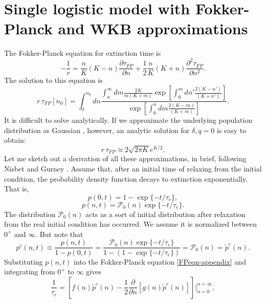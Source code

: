 \section*{Single logistic model with Fokker-Planck and WKB approximations} %
The Fokker-Planck equation for extinction time is \cite{Nisbet1982}
\begin{equation}
-\frac{1}{r} = \frac{n}{K}(K-n)\frac{\partial\tau_{FP}}{\partial n}+\frac{1}{2}\frac{n}{K}(K+n)\frac{\partial^2\tau_{FP}}{\partial n^2}. 
 \label{FPeqn-appendix} 
\end{equation}
The solution to this equation is
\begin{equation}%
r\,\tau_{FP}[n_0] = \int^{n_0}_0 dn\frac{\int_n^\infty dm\frac{2K}{m(K+m)}\exp[\int^m_0dn'\frac{2(K-n')}{(K+n')}]}{\exp[\int^n_0dm\frac{2(K-m)}{(K+m)}]}.  
\end{equation}
It is difficult to solve analytically. 
If we approximate the underlying population distribution as Gaussian \cite{Nisbet1982}, however, an analytic solution for $\delta,q=0$ is easy to obtain:
\begin{equation}
r\,\tau_{FP} \approx 2\sqrt{2\pi K}e^{K/2}. 
 \label{tau-fp-gauss-appendix}
\end{equation}
Let me sketch out a derivation of all these approximations, in brief, following Nisbet and Gurney \cite{Nisbet1982}. 
Assume that, after an initial time of relaxing from the initial condition, the probability density function decays to extinction exponentially. That is,
\begin{equation}
p(0,t) = 1 - \exp\{-t/\tau_e\},
\end{equation}
\begin{equation}
p(n,t) = \mathcal{P}_0(n)\exp\{-t/\tau_e\}.
\end{equation}
The distribution $\mathcal{P}_0(n)$ acts as a sort of initial distribution after relaxation from the real initial condition has occurred.  We assume it is normalized between $0^+$ and $\infty$. But note that
\begin{equation}
p^c(n,t) \equiv \frac{p(n,t)}{1-p(0,t)}
= \frac{\mathcal{P}_0(n)\exp\{-t/\tau_e\}}{1-\left(1-\exp\{-t/\tau_e\}\right)}
= \mathcal{P}_0(n)
= \widetilde{p}^c(n).  
\end{equation}
Substituting $p(n,t)$ into the Fokker-Planck equation \ref{FPeqn-appendix} and integrating from $0^+$ to $\infty$ gives
\begin{equation}
\frac{1}{\tau_e} = \left[f(n)\widetilde{p}^c(n) - \frac{1}{2}\frac{\partial}{\partial n}[g(n)\widetilde{p}^c(n)]\right]\Bigg\vert^{n=\infty}_{n=0},
\end{equation}
